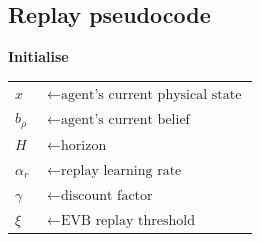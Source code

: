 \documentclass{article}
\begin{document}
\newpage

\subsection*{Replay pseudocode}

\textbf{Initialise}\\ 
\begin{tabular}{ll}
    $x$ & $\leftarrow \text{agent's current physical state}$\\
    $b_{\rho}$ & $\leftarrow \text{agent's current belief}$ \\
    $H$ & $\leftarrow \text{horizon}$\\ 
    $\alpha_r$ & $\leftarrow \text{replay learning rate}$\\
    $\gamma$ & $\leftarrow \text{discount factor}$\\ 
    $\xi$ & $\leftarrow \text{EVB replay threshold}$  
\end{tabular}

\bigbreak
\end{document}
